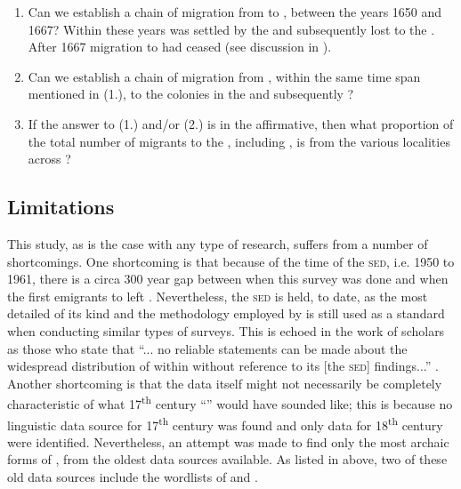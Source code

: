 \begin{enumerate}
\item{ Can we establish a chain of migration from  to , between the years 1650 and 1667? Within these years  was settled by the  and subsequently lost to the . After 1667  migration to  had ceased (see discussion in ).}
\item{Can we establish a chain of migration from , within the same time span mentioned in (1.), to the  colonies in the  and subsequently ?}
\item{If the answer to (1.) and/or (2.) is in the affirmative, then what proportion of the total number of migrants to the , including , is from the various localities across ?}
\end{enumerate}


\subsection{Limitations}
This study, as is the case with any type of research, suffers from a number of shortcomings. One shortcoming is that because of the time of the \textsc{sed}, i.e. 1950 to 1961, there is a circa 300 year gap between when this survey was done and when the first emigrants to  left . Nevertheless, the \textsc{sed} is held, to date, as the most detailed of its kind and the methodology employed by \citet{Orton6271} is still used as a standard when conducting similar types of surveys. This is echoed in the work of scholars as those who state that ``... no reliable statements can be made about the widespread distribution of  within  without reference to its [the \textsc{sed}] findings...'' \citep[29]{Kortmann04}. Another shortcoming is that the  data itself might not necessarily be completely characteristic of what 17\textsuperscript{th} century ``'' would have sounded like; this is because no linguistic data source for 17\textsuperscript{th} century  was found and only data for 18\textsuperscript{th} century  were identified. Nevertheless, an attempt was made to find only the most archaic forms of , from the oldest  data sources available. As listed in  above, two of these old data sources include the wordlists of \citet{Herlein18} and  \citet{Schumann83}.

